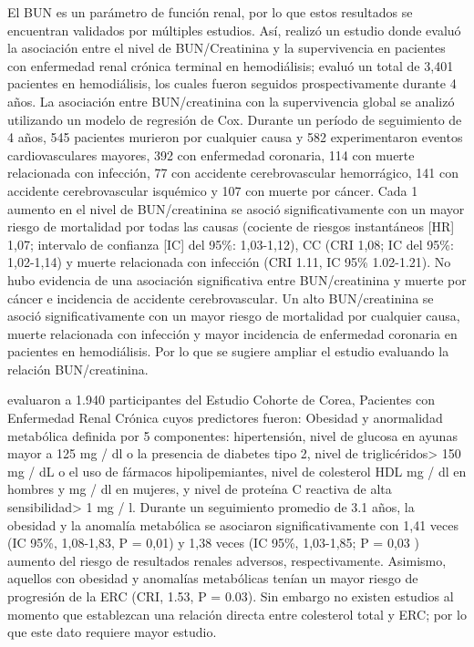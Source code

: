 \documentclass[runningheads,a4paper]{llncs}
\begin{document}
El BUN es un parámetro de función renal, por lo que estos resultados se encuentran validados por múltiples estudios.  Así, \cite{tanaka2017impact} realizó un estudio donde evaluó la asociación entre el nivel de BUN/Creatinina y la supervivencia en pacientes con enfermedad renal crónica terminal en  hemodiálisis; evaluó un total de 3,401 pacientes en hemodiálisis, los cuales  fueron seguidos prospectivamente durante 4 años. La asociación entre BUN/creatinina con la supervivencia global se analizó utilizando un modelo de regresión de Cox. Durante un período de seguimiento de 4 años, 545 pacientes murieron por cualquier causa y 582 experimentaron eventos cardiovasculares mayores, 392 con enfermedad coronaria, 114 con muerte relacionada con infección, 77 con accidente cerebrovascular hemorrágico, 141 con accidente cerebrovascular isquémico y 107 con muerte por cáncer. Cada 1 aumento en el nivel de BUN/creatinina se asoció significativamente con un mayor riesgo de mortalidad por todas las causas (cociente de riesgos instantáneos [HR] 1,07; intervalo de confianza [IC] del 95\%: 1,03-1,12), CC (CRI 1,08; IC del 95\%: 1,02-1,14) y muerte relacionada con infección (CRI 1.11, IC 95\% 1.02-1.21). No hubo evidencia de una asociación significativa entre BUN/creatinina y muerte por cáncer e incidencia de accidente cerebrovascular. Un alto BUN/creatinina se asoció significativamente con un mayor riesgo de mortalidad por cualquier causa, muerte relacionada con infección y mayor incidencia de enfermedad coronaria en pacientes en hemodiálisis. Por lo que se sugiere ampliar el estudio evaluando la relación BUN/creatinina.

\cite{yun2018obesity} evaluaron a 1.940 participantes del Estudio Cohorte de Corea,  Pacientes con Enfermedad Renal Crónica cuyos predictores fueron:  Obesidad y anormalidad metabólica  definida por  5 componentes: hipertensión, nivel de glucosa en ayunas mayor a 125 mg / dl o la presencia de diabetes tipo 2, nivel de triglicéridos> 150 mg / dL o el uso de fármacos hipolipemiantes, nivel de colesterol HDL  mg / dl en hombres y  mg / dl en mujeres, y nivel de proteína C reactiva de alta sensibilidad> 1 mg / l.  
Durante un seguimiento promedio de 3.1 años, la obesidad y la anomalía metabólica se asociaron significativamente con 1,41 veces (IC 95\%, 1,08-1,83, P = 0,01) y 1,38 veces (IC 95\%, 1,03-1,85; P = 0,03 ) aumento del riesgo de resultados renales adversos, respectivamente. Asimismo,  aquellos con obesidad y anomalías metabólicas tenían un mayor riesgo de progresión de la ERC (CRI, 1.53, P = 0.03).  Sin embargo no existen estudios al momento que establezcan una relación directa entre colesterol total y ERC; por lo que este dato requiere mayor estudio.
\end{document}
